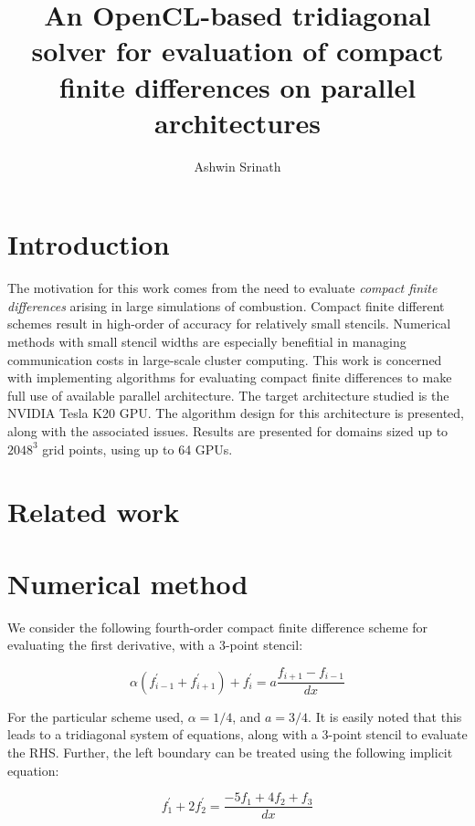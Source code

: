 \documentclass{article}
\author{Ashwin Srinath}
\title{An OpenCL-based tridiagonal solver for evaluation
    of compact finite differences on parallel architectures}
\begin{document}

\section{Introduction}

    The motivation for this work comes from the need to evaluate
    \emph{compact finite differences} arising in large simulations of combustion.
    Compact finite different schemes result in
    high-order of accuracy for relatively small stencils.
    Numerical methods with small stencil widths are especially benefitial
    in managing communication costs in large-scale cluster computing.
    This work is concerned with implementing algorithms for evaluating
    compact finite differences to make full use of available parallel architecture.
    The target architecture studied is the NVIDIA Tesla K20 GPU.
    The algorithm design for this architecture is presented,
    along with the associated issues.
    Results are presented for domains sized up to $2048^3$ grid points,
    using up to 64 GPUs.

\section{Related work}



\section{Numerical method}

    We consider the following fourth-order
    compact finite difference scheme for evaluating the first derivative,
    with a 3-point stencil:

    \begin{equation}
        \alpha(f^{\prime}_{i-1} + f^{\prime}_{i+1}) + f^{\prime}_i
        =
        a\frac{f_{i+1} - f_{i-1}}{dx}
    \end{equation}

    For the particular scheme used, $\alpha = 1/4$,
    and $ a = 3/4 $.
    It is easily noted that this leads to a tridiagonal system of equations,
    along with a 3-point stencil to evaluate the RHS.
    Further, the left boundary can be treated using the following implicit equation:

    \begin{equation}
        f^{\prime}_1 + 2f^{\prime}_2 = \frac{-5f_1 + 4f_2 + f_3}{dx}
    \end{equation}
\end{document}

